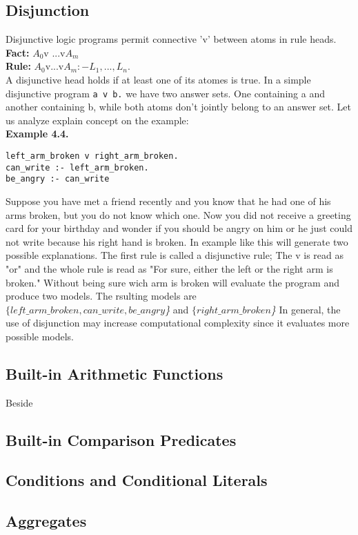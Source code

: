 \documentclass[14pt,a4paper, titlepage]{article}
\begin{document}
\subsection{Disjunction}
Disjunctive logic programs permit connective 'v' between atoms in rule heads.\\ \textbf{Fact:} $A_0$v ...v$A_m$
\\ \textbf{Rule:} $A_0$v...v$A_m :- L_1,...,L_n. $
\\ A disjunctive head holds if at least one of its atomes is true. In a simple disjunctive program \texttt{a v b.} we have two answer sets. One containing a and another containing b, while both atoms don't jointly belong to an answer set. Let us analyze explain concept on the example:
\\ \textbf{Example 4.4.}
\begin{lstlisting}
left_arm_broken v right_arm_broken.
can_write :- left_arm_broken.
be_angry :- can_write
\end{lstlisting}
Suppose you have met a friend recently and you know that he had one of his arms broken, but you do not know which one. Now you did not receive a greeting card for your birthday and wonder if you should be angry on him or he just could not write because his right hand is broken. In example like this \dlvhex{} will generate two possible explanations. The first rule is called a disjunctive rule; The v is read as "or" and the whole rule is read as "For sure, either the left or the right arm is broken." Without being sure wich arm is broken \dlvhex{} will evaluate the program and produce two models. The rsulting models are \textit{$\{left\_arm\_broken, can\_write, be\_angry$\}} and \textit{$\{right\_arm\_broken$\}}  
In general, the use of disjunction may increase computational complexity since it evaluates more possible models.        
\subsection{Built-in Arithmetic Functions}
Beside 
\subsection{Built-in Comparison Predicates}

\subsection{Conditions and Conditional Literals}

\subsection{Aggregates}
\end{document}
